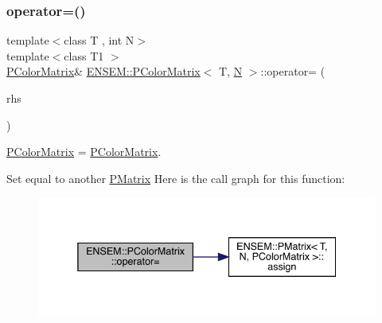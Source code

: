 \subsubsection{\texorpdfstring{operator=()}{operator=()}\hspace{0.1cm}{\footnotesize\ttfamily [4/6]}}
{\footnotesize\ttfamily template$<$class T , int N$>$ \\
template$<$class T1 $>$ \\
\mbox{\hyperlink{classENSEM_1_1PColorMatrix}{P\+Color\+Matrix}}\& \mbox{\hyperlink{classENSEM_1_1PColorMatrix}{E\+N\+S\+E\+M\+::\+P\+Color\+Matrix}}$<$ T, \mbox{\hyperlink{adat__devel_2lib_2hadron_2operator__name__util_8cc_a7722c8ecbb62d99aee7ce68b1752f337}{N}} $>$\+::operator= (\begin{DoxyParamCaption}\item[{const \mbox{\hyperlink{classENSEM_1_1PColorMatrix}{P\+Color\+Matrix}}$<$ T1, \mbox{\hyperlink{adat__devel_2lib_2hadron_2operator__name__util_8cc_a7722c8ecbb62d99aee7ce68b1752f337}{N}} $>$ \&}]{rhs }\end{DoxyParamCaption})\hspace{0.3cm}{\ttfamily [inline]}}



\mbox{\hyperlink{classENSEM_1_1PColorMatrix}{P\+Color\+Matrix}} = \mbox{\hyperlink{classENSEM_1_1PColorMatrix}{P\+Color\+Matrix}}. 

Set equal to another \mbox{\hyperlink{classENSEM_1_1PMatrix}{P\+Matrix}} Here is the call graph for this function\+:\nopagebreak
\begin{figure}[H]
\begin{center}
\leavevmode
\includegraphics[width=338pt]{d8/d21/classENSEM_1_1PColorMatrix_a529b6a2c63f2087a6a336af14b6f80eb_cgraph}
\end{center}
\end{figure}
\mbox{\label{classENSEM_1_1PColorMatrix_a529b6a2c63f2087a6a336af14b6f80eb}} 
